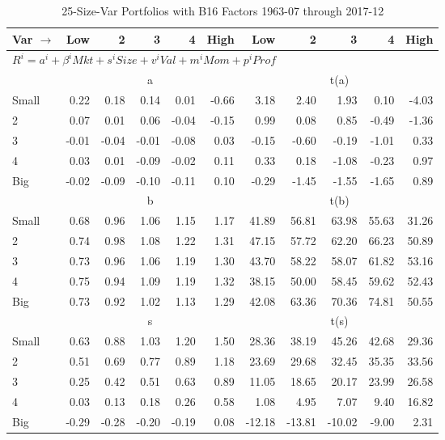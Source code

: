 
\begin{table}[H]
\footnotesize
\centering
\caption{25-Size-Var Portfolios with B16 Factors 1963-07 through 2017-12}
\begin{tabular}{lrrrrrrrrrr}
  \toprule
    
    Var $\rightarrow$ & Low & 2 & 3 & 4 & High & Low & 2 & 3 & 4 & High  \\ 
  \midrule
  \multicolumn{11}{l}{$R^i=a^i+\beta^iMkt+s^iSize+v^iVal+m^iMom+p^iProf$}  \\
  
     & \multicolumn{5}{c}{a} & \multicolumn{5}{c}{t(a)}   \\
     \cmidrule(r){2-6} \cmidrule(r){7-11} 
    Small  & 0.22  & 0.18  & 0.14  & 0.01  & -0.66  & 3.18  & 2.40  & 1.93  & 0.10  & -4.03   \\
    2  & 0.07  & 0.01  & 0.06  & -0.04  & -0.15  & 0.99  & 0.08  & 0.85  & -0.49  & -1.36   \\
    3  & -0.01  & -0.04  & -0.01  & -0.08  & 0.03  & -0.15  & -0.60  & -0.19  & -1.01  & 0.33   \\
    4  & 0.03  & 0.01  & -0.09  & -0.02  & 0.11  & 0.33  & 0.18  & -1.08  & -0.23  & 0.97   \\
    Big  & -0.02  & -0.09  & -0.10  & -0.11  & 0.10  & -0.29  & -1.45  & -1.55  & -1.65  & 0.89   \\
    
  
     & \multicolumn{5}{c}{b} & \multicolumn{5}{c}{t(b)}   \\
     \cmidrule(r){2-6} \cmidrule(r){7-11} 
    Small  & 0.68  & 0.96  & 1.06  & 1.15  & 1.17  & 41.89  & 56.81  & 63.98  & 55.63  & 31.26   \\
    2  & 0.74  & 0.98  & 1.08  & 1.22  & 1.31  & 47.15  & 57.72  & 62.20  & 66.23  & 50.89   \\
    3  & 0.73  & 0.96  & 1.06  & 1.19  & 1.30  & 43.70  & 58.22  & 58.07  & 61.82  & 53.16   \\
    4  & 0.75  & 0.94  & 1.09  & 1.19  & 1.32  & 38.15  & 50.00  & 58.45  & 59.62  & 52.43   \\
    Big  & 0.73  & 0.92  & 1.02  & 1.13  & 1.29  & 42.08  & 63.36  & 70.36  & 74.81  & 50.55   \\
    
  
     & \multicolumn{5}{c}{s} & \multicolumn{5}{c}{t(s)}   \\
     \cmidrule(r){2-6} \cmidrule(r){7-11} 
    Small  & 0.63  & 0.88  & 1.03  & 1.20  & 1.50  & 28.36  & 38.19  & 45.26  & 42.68  & 29.36   \\
    2  & 0.51  & 0.69  & 0.77  & 0.89  & 1.18  & 23.69  & 29.68  & 32.45  & 35.35  & 33.56   \\
    3  & 0.25  & 0.42  & 0.51  & 0.63  & 0.89  & 11.05  & 18.65  & 20.17  & 23.99  & 26.58   \\
    4  & 0.03  & 0.13  & 0.18  & 0.26  & 0.58  & 1.08  & 4.95  & 7.07  & 9.40  & 16.82   \\
    Big  & -0.29  & -0.28  & -0.20  & -0.19  & 0.08  & -12.18  & -13.81  & -10.02  & -9.00  & 2.31   \\
    

\end{tabular}
\end{table}
